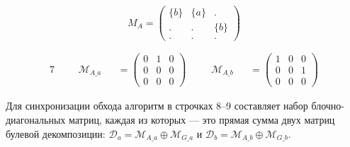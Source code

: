 \[ M_A =
  \begin{pmatrix}
    \{b\} & \{a\} & .     \\
    .     & .     & \{b\} \\
    .     & .     & .
  \end{pmatrix}
\]

\begin{alignat}{7}
   &  &  & \mathcal{M}_{A\_a} &  & = \begin{pmatrix}
                                       0 & 1 & 0 \\
                                       0 & 0 & 0 \\
                                       0 & 0 & 0
                                     \end{pmatrix} \ \ \ \  &  & \mathcal{M}_{A\_b} &  & = \begin{pmatrix}
                                                                                             1 & 0 & 0 \\
                                                                                             0 & 0 & 1 \\
                                                                                             0 & 0 & 0
                                                                                           \end{pmatrix}
\end{alignat}

Для синхронизации обхода алгоритм в строчках 8--9 составляет набор блочно-диагональных матриц, каждая из которых --- это прямая сумма двух матриц булевой декомпозиции:
$\mathcal{D}_{a} = \mathcal{M}_{A\_a} \oplus \mathcal{M}_{G\_a}$ и $\mathcal{D}_{b} = \mathcal{M}_{A\_b} \oplus \mathcal{M}_{G\_b}$.

